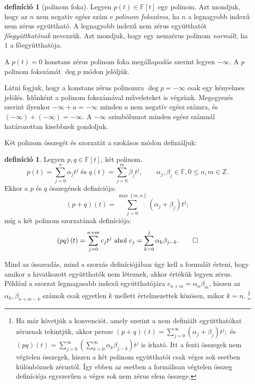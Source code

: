 \documentclass[a4paper, showtrims]{memoir}
\theoremstyle{plain}
\theoremstyle{remark}
\theoremstyle{definition}
\newtheorem{definition}[proposition]{definíció}
\begin{document}
\begin{definition}[polinom foka]
	Legyen $p\left( t \right)\in\mathbb{F}\left[ t \right]$ egy polinom.
	Azt mondjuk, hogy az $n$ nem negatív egész szám e \emph{polinom fokszáma},
	ha $n$ a legnagyobb indexű nem zérus együttható.
	A legnagyobb indexű nem zérus együtthatót \emph{főegyütthatónak} nevezzük.
	Azt mondjuk, hogy egy nemzérus polinom \emph{normált}, ha $1$ a főegyütthatója.

	A $p\left( t \right)=0$ konstans zérus polinom foka megállapodás szerint legyen $-\infty$.
	A $p$ polinom fokszámát $\deg p$ módon jelöljük.
\end{definition}
Látni fogjuk, hogy a konstans zérus polinomra $\deg p=-\infty$ csak egy kényelmes jelölés.
Időnként a polinom fokszámával műveleteket is végzünk.
Megegyezés szerint ilyenkor $-\infty+a=-\infty$ minden $a$ nem negatív egész számra,
és $\left( -\infty \right)+\left( -\infty \right)=-\infty.$
A $-\infty$ szimbólumot minden egész számnál határozottan kisebbnek gondoljuk.

Két polinom összegét és szorzatát a szokásos módon definiáljuk:
\begin{definition}\label{def:polmuveletek}
	Legyen $p,q\in\mathbb{F}[t]$, két polinom.
	\[
		p\left( t \right)
		=
		\sum_{j=0}^n\alpha_jt^j
		\text{ és }
		q\left( t \right)
		=
		\sum_{j=0}^m\beta_jt^j,
		\qquad
		\alpha_j,\beta_j\in\mathbb{F},
		0\leq n,m\in\mathbb{Z}.
	\]
	Ekkor a $p$ és $q$ összegének definíciója:
	\[
		\left( p+q \right)\left( t \right)
		=
		\sum_{j=0}^{\max{\left\{ m,n \right\}}}\left( \alpha_j+\beta_j \right)t^j;
	\]
	míg a két polinom szorzatának definíciója:
	\[
		\left( pq \right)\left( t \right)
		=
		\sum_{j=0}^{n+m}c_jt^j
		\text{ ahol }
		c_j
		=
		\sum_{k=0}^j\alpha_k\beta_{j-k}.
		\qedhere
	\]
\end{definition}
Mind az összeadás, mind a szorzás definíciójában úgy kell a formulát érteni,
hogy amikor a hivatkozott együtthatók nem léteznek,
akkor értékük legyen zérus.
Például a szorzat legmagasabb indexű együtthatójára
$c_{n+m}=\alpha_n\beta_m$, hiszen az $\alpha_k,\beta_{n+m-k}$ számok
csak egyetlen $k$ mellett értelmezettek közösen, mikor $k=n$.
\footnote
{
	Ha már követjük a konvenciót,
	amely szerint a nem definiált együtthatókat zérusnak tekintjük,
	akkor persze
	\(
	\left( p+q \right)\left( t \right)
	=
	\sum_{j=0}^\infty\left( \alpha_j+\beta_j \right)t^j;
	\)
	és
	\(
	\left( pq \right)\left( t \right)
	=
	\sum_{j=0}^\infty\left( \sum_{k=0}^\infty\alpha_k\beta_{j-k} \right)t^j
	\)
	is írható.
	Itt a fenti összegek nem végtelen összegek, hiszen a két polinom együtthatói
	csak véges sok esetben különböznek zérustól.
	Így ebben az esetben a formálisan végtelen összeg definíciója
	egyszerűen a véges sok nem zérus elem összege.
}
\end{document}
